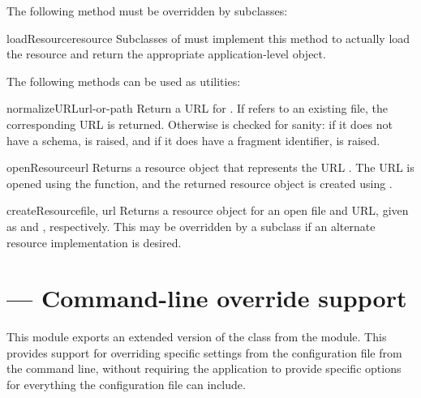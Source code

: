 \documentclass{howto}
\begin{document}
The following method must be overridden by subclasses:

\begin{methoddesc}[loader]{loadResource}{resource}
  Subclasses of  must implement this method to
  actually load the resource and return the appropriate
  application-level object.
\end{methoddesc}

The following methods can be used as utilities:

\begin{methoddesc}[loader]{normalizeURL}{url-or-path}
  Return a URL for .  If  refers to
  an existing file, the corresponding  URL is returned.
  Otherwise  is checked for sanity: if it
  does not have a schema,  is raised, and if it
  does have a fragment identifier,  is
  raised.
\end{methoddesc}

\begin{methoddesc}[loader]{openResource}{url}
  Returns a resource object that represents the URL .  The
  URL is opened using the  function, and
  the returned resource object is created using
  .
\end{methoddesc}

\begin{methoddesc}[loader]{createResource}{file, url}
  Returns a resource object for an open file and URL, given as
   and , respectively.  This may be overridden by a
  subclass if an alternate resource implementation is desired.
\end{methoddesc}


\section{ --- Command-line override support}


This module exports an extended version of the 
class from the  module.  This provides
support for overriding specific settings from the configuration file
from the command line, without requiring the application to provide
specific options for everything the configuration file can include.
\end{document}
